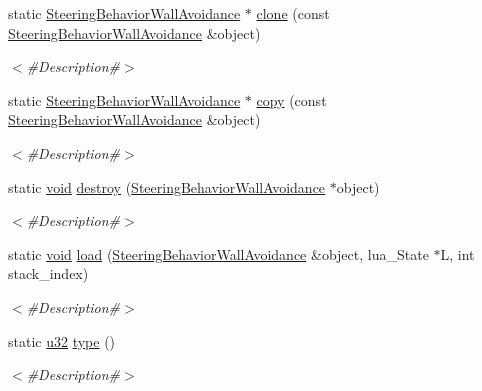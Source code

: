 \begin{DoxyCompactItemize}
static \mbox{\hyperlink{classnjli_1_1_steering_behavior_wall_avoidance}{Steering\+Behavior\+Wall\+Avoidance}} $\ast$ \mbox{\hyperlink{classnjli_1_1_steering_behavior_wall_avoidance_accb95d70a5fba8e9146076074815253b}{clone}} (const \mbox{\hyperlink{classnjli_1_1_steering_behavior_wall_avoidance}{Steering\+Behavior\+Wall\+Avoidance}} \&object)
\begin{DoxyCompactList}\small\item\em $<$\#\+Description\#$>$ \end{DoxyCompactList}\item 
static \mbox{\hyperlink{classnjli_1_1_steering_behavior_wall_avoidance}{Steering\+Behavior\+Wall\+Avoidance}} $\ast$ \mbox{\hyperlink{classnjli_1_1_steering_behavior_wall_avoidance_a2be7e595c37e5c401ea81e32e37cf81f}{copy}} (const \mbox{\hyperlink{classnjli_1_1_steering_behavior_wall_avoidance}{Steering\+Behavior\+Wall\+Avoidance}} \&object)
\begin{DoxyCompactList}\small\item\em $<$\#\+Description\#$>$ \end{DoxyCompactList}\item 
static \mbox{\hyperlink{_thread_8h_af1e856da2e658414cb2456cb6f7ebc66}{void}} \mbox{\hyperlink{classnjli_1_1_steering_behavior_wall_avoidance_af95d1f2642c824237b27c65e5526d7f5}{destroy}} (\mbox{\hyperlink{classnjli_1_1_steering_behavior_wall_avoidance}{Steering\+Behavior\+Wall\+Avoidance}} $\ast$object)
\begin{DoxyCompactList}\small\item\em $<$\#\+Description\#$>$ \end{DoxyCompactList}\item 
static \mbox{\hyperlink{_thread_8h_af1e856da2e658414cb2456cb6f7ebc66}{void}} \mbox{\hyperlink{classnjli_1_1_steering_behavior_wall_avoidance_aaf692e31ae1a20bfd815e3640fa06eeb}{load}} (\mbox{\hyperlink{classnjli_1_1_steering_behavior_wall_avoidance}{Steering\+Behavior\+Wall\+Avoidance}} \&object, lua\+\_\+\+State $\ast$L, int stack\+\_\+index)
\begin{DoxyCompactList}\small\item\em $<$\#\+Description\#$>$ \end{DoxyCompactList}\item 
static \mbox{\hyperlink{_util_8h_a10e94b422ef0c20dcdec20d31a1f5049}{u32}} \mbox{\hyperlink{classnjli_1_1_steering_behavior_wall_avoidance_a09b82f632fc82a4a7bb076ca7c4ae47d}{type}} ()
\begin{DoxyCompactList}\small\item\em $<$\#\+Description\#$>$ \end{DoxyCompactList}\end{DoxyCompactItemize}
